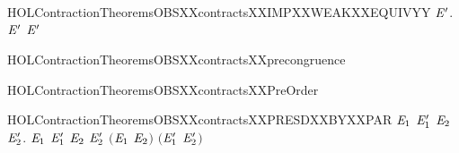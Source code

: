 \newcommand{\HOLContractionTheoremsOBSXXcontractsXXIMPXXWEAKXXEQUIV}{\UseVerbatim{HOLContractionTheoremsOBSXXcontractsXXIMPXXWEAKXXEQUIV}}
\begin{SaveVerbatim}{HOLContractionTheoremsOBSXXcontractsXXIMPXXWEAKXXEQUIVYY}
\HOLTokenTurnstile{} \HOLSymConst{\HOLTokenForall{}} \ensuremath{\HOLBoundVar{E}\sp{\prime}}.   \ensuremath{\HOLBoundVar{E}\sp{\prime}} \HOLSymConst{\HOLTokenImp{}}   \ensuremath{\HOLBoundVar{E}\sp{\prime}}
\end{SaveVerbatim}
\newcommand{\HOLContractionTheoremsOBSXXcontractsXXIMPXXWEAKXXEQUIVYY}{\UseVerbatim{HOLContractionTheoremsOBSXXcontractsXXIMPXXWEAKXXEQUIVYY}}
\begin{SaveVerbatim}{HOLContractionTheoremsOBSXXcontractsXXprecongruence}
\HOLTokenTurnstile{}  
\end{SaveVerbatim}
\newcommand{\HOLContractionTheoremsOBSXXcontractsXXprecongruence}{\UseVerbatim{HOLContractionTheoremsOBSXXcontractsXXprecongruence}}
\begin{SaveVerbatim}{HOLContractionTheoremsOBSXXcontractsXXPreOrder}
\HOLTokenTurnstile{}  
\end{SaveVerbatim}
\newcommand{\HOLContractionTheoremsOBSXXcontractsXXPreOrder}{\UseVerbatim{HOLContractionTheoremsOBSXXcontractsXXPreOrder}}
\begin{SaveVerbatim}{HOLContractionTheoremsOBSXXcontractsXXPRESDXXBYXXPAR}
\HOLTokenTurnstile{} \HOLSymConst{\HOLTokenForall{}}\ensuremath{\HOLBoundVar{E}\sb{\mathrm{1}}} \ensuremath{\HOLBoundVar{E}\sb{\mathrm{1}}\sp{\prime}} \ensuremath{\HOLBoundVar{E}\sb{\mathrm{2}}} \ensuremath{\HOLBoundVar{E}\sb{\mathrm{2}}\sp{\prime}}.
        \ensuremath{\HOLBoundVar{E}\sb{\mathrm{1}}} \ensuremath{\HOLBoundVar{E}\sb{\mathrm{1}}\sp{\prime}} \HOLSymConst{\HOLTokenConj{}}  \ensuremath{\HOLBoundVar{E}\sb{\mathrm{2}}} \ensuremath{\HOLBoundVar{E}\sb{\mathrm{2}}\sp{\prime}} \HOLSymConst{\HOLTokenImp{}}
        \ensuremath{(}\ensuremath{\HOLBoundVar{E}\sb{\mathrm{1}}} \HOLSymConst{\ensuremath{\mid}} \ensuremath{\HOLBoundVar{E}\sb{\mathrm{2}}}\ensuremath{)} \ensuremath{(}\ensuremath{\HOLBoundVar{E}\sb{\mathrm{1}}\sp{\prime}} \HOLSymConst{\ensuremath{\mid}} \ensuremath{\HOLBoundVar{E}\sb{\mathrm{2}}\sp{\prime}}\ensuremath{)}
\end{SaveVerbatim}
\newcommand{\HOLContractionTheoremsOBSXXcontractsXXPRESDXXBYXXPAR}{\UseVerbatim{HOLContractionTheoremsOBSXXcontractsXXPRESDXXBYXXPAR}}
